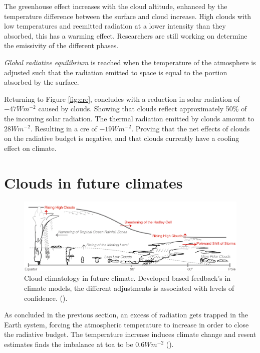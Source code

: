 The greenhouse effect increases with the cloud altitude, enhanced by the temperature difference between the surface and cloud increase. High clouds with low temperatures and  reemitted radiation at a lower intensity than they absorbed, this has a warming effect. Researchers are still working on determine the emissivity of the different phases. 

\textit{Global radiative equilibrium} is reached when the temperature of the atmosphere is adjusted such that the radiation emitted to space is equal to the portion absorbed by the surface.

Returning to Figure \ref{fig:cre}, \citeauthor{Wild2019TheModels} concludes with a reduction in solar radiation of $-47Wm^{-2}$ caused by clouds. Showing that clouds reflect approximately 50\% of the incoming solar radiation. The thermal radiation emitted by clouds amount to $28Wm^{-2}$. Resulting in a \acrshort{cre} of $-19Wm^{-2}$. Proving that the net effects of clouds on the radiative budget is negative, and that clouds currently have a cooling effect on climate.

\section{Clouds in future climates} \label{sec:intro_cloud_future_climates}
\begin{figure}[h]
    \centering
    \includegraphics[scale = 0.8]{Chapter1_Intro/images/Fig7-11_ipcc.jpg}
    \caption{Cloud climatology in future climate. Developed based feedback's in climate models, the different adjustments is associated with levels of confidence.  (\cite{IPCC_CH7_clouds}).}
    \label{fig:cloud_scheme}
\end{figure}
As concluded in the previous section, an excess of radiation gets trapped in the Earth system, forcing the atmospheric temperature to increase in order to close the radiative budget. The temperature increase induces climate change and resent estimates finds the imbalance at \acrshort{toa} to be $0.6 Wm^{-2}$ (\cite{Wild2019TheModels}).

